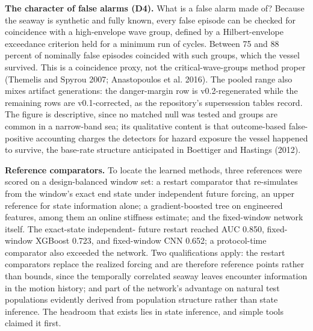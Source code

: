 \documentclass[11pt]{article}
\begin{document}
\textbf{The character of false alarms (D4).} What is a false alarm made of? Because the seaway is
synthetic and fully known, every false episode can be checked for coincidence with a
high-envelope wave group, defined by a Hilbert-envelope exceedance criterion held for a minimum
run of cycles. Between 75 and 88 percent of nominally false episodes
coincided with such groups, which the vessel survived. This is a coincidence proxy, not the
critical-wave-groups method proper (Themelis and Spyrou 2007; Anastopoulos et al. 2016). The
pooled range also mixes artifact generations: the danger-margin row is v0.2-regenerated while
the remaining rows are v0.1-corrected, as the repository's supersession tables record. The
figure is descriptive, since no matched null was
tested and groups are common in a narrow-band sea; its qualitative content is that outcome-based
false-positive accounting charges the detectors for hazard exposure the vessel happened to
survive, the base-rate structure anticipated in Boettiger and Hastings (2012).

\textbf{Reference comparators.} To locate the learned methods, three references were scored on a
design-balanced window set: a restart comparator that re-simulates from the window's exact end
state under independent future forcing, an upper reference for state information alone; a
gradient-boosted tree on engineered features, among them an online stiffness estimate; and the
fixed-window network itself. The exact-state independent-
future restart reached AUC 0.850, fixed-window XGBoost 0.723, and fixed-window CNN 0.652; a
protocol-time comparator also exceeded the network. Two qualifications apply: the restart
comparators replace the realized forcing and are therefore reference points rather than bounds,
since the temporally correlated seaway leaves encounter information in the motion history; and
part of the network's advantage on natural test populations evidently derived from population
structure rather than state inference. The headroom that exists lies in state inference, and
simple tools claimed it first.
\end{document}
